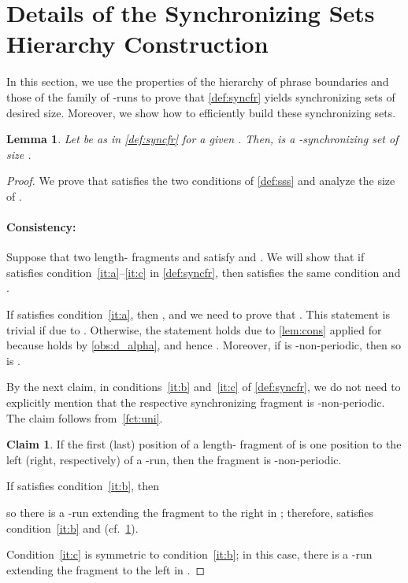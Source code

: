\documentclass[a4paper]{article}
\newtheorem{lemma}[theorem]{Lemma}
\theoremstyle{definition}
\newtheorem{claim}[theorem]{Claim}
\theoremstyle{remark}
\begin{document}
\section{Details of the Synchronizing Sets Hierarchy Construction}\label{sec:correctness}

In this section, we use the properties of the hierarchy of phrase boundaries  and those of the family  of -runs to prove that \cref{def:syncfr} yields synchronizing sets of desired size. Moreover, we show how to efficiently build these synchronizing sets.

\begin{lemma}\label{lem:sss}
Let  be as in \cref{def:syncfr} for a given .
Then,  is a -synchronizing set of size .
\end{lemma}
\begin{proof}
We prove that  satisfies the two conditions of \cref{def:sss} and analyze the size of .

\paragraph*{\bf Consistency:}
Suppose that two length- fragments  and  satisfy  and .
We will show that if  satisfies condition~\ref{it:a}--\ref{it:c} in \cref{def:syncfr}, then  satisfies the same condition and .

If  satisfies condition~\ref{it:a}, then , and we need to prove that . This statement is trivial if  due to . Otherwise, the statement holds due to \cref{lem:cons} applied for  because  holds by \cref{obs:d_alpha}, and hence . Moreover, if  is -non-periodic, then so is .

By the next claim, in conditions~\ref{it:b} and~\ref{it:c} of \cref{def:syncfr}, we do not need to explicitly mention that the respective synchronizing fragment is -non-periodic. The claim follows from~\cref{fct:uni}.

\begin{claim}\label{fct:bc}
If the first (last) position of a length- fragment of  is one position to the left (right, respectively) of a -run, then the fragment is -non-periodic.
\end{claim}

If  satisfies condition~\ref{it:b}, then

so there is a -run extending the fragment  to the right in ; therefore,  satisfies condition~\ref{it:b} and 
(cf.~\cref{fct:bc}).

Condition~\ref{it:c} is symmetric to condition~\ref{it:b}; in this case, there is a -run extending the fragment  to the left in .


\end{proof}
\end{document}
